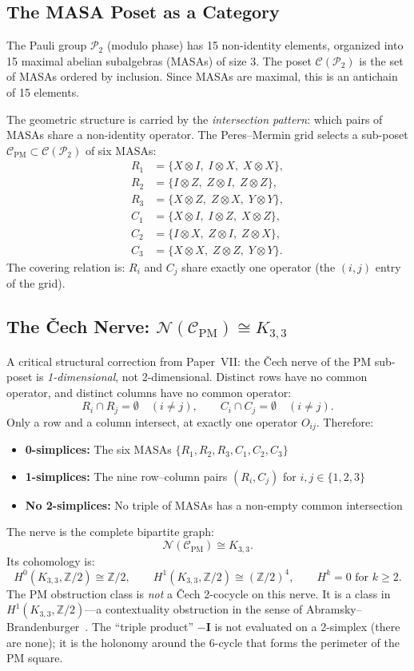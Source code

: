 \documentclass[11pt,a4paper]{article}
\theoremstyle{remark}
\newcommand{\Z}{\mathbb{Z}}
\newcommand{\cC}{\mathcal{C}}
\newcommand{\cN}{\mathcal{N}}
\newcommand{\PP}{\mathcal{P}}
\begin{document}
\subsection{The MASA Poset as a Category}

The Pauli group $\PP_2$ (modulo phase) has 15 non-identity elements,
organized into 15 maximal abelian subalgebras (MASAs) of size 3.
The poset $\cC(\PP_2)$ is the set of MASAs ordered by inclusion.
Since MASAs are maximal, this is an antichain of 15 elements.

The geometric structure is carried by the \emph{intersection pattern}:
which pairs of MASAs share a non-identity operator. The Peres--Mermin
grid selects a sub-poset $\cC_{\text{PM}} \subset \cC(\PP_2)$ of six MASAs:
\begin{align*}
  R_1 &= \{X \otimes I,\; I \otimes X,\; X \otimes X\}, \\
  R_2 &= \{I \otimes Z,\; Z \otimes I,\; Z \otimes Z\}, \\
  R_3 &= \{X \otimes Z,\; Z \otimes X,\; Y \otimes Y\}, \\
  C_1 &= \{X \otimes I,\; I \otimes Z,\; X \otimes Z\}, \\
  C_2 &= \{I \otimes X,\; Z \otimes I,\; Z \otimes X\}, \\
  C_3 &= \{X \otimes X,\; Z \otimes Z,\; Y \otimes Y\}.
\end{align*}
The covering relation is: $R_i$ and $C_j$ share exactly one operator
(the $(i,j)$ entry of the grid).

\subsection{The \v{C}ech Nerve: $\cN(\cC_{\text{PM}}) \cong K_{3,3}$}
\label{sec:k33}

A critical structural correction from Paper~VII: the \v{C}ech nerve of
the PM sub-poset is \emph{1-dimensional}, not 2-dimensional. Distinct
rows have no common operator, and distinct columns have no common operator:
\[
R_i \cap R_j = \emptyset \quad (i \neq j), \qquad
C_i \cap C_j = \emptyset \quad (i \neq j).
\]
Only a row and a column intersect, at exactly one operator $O_{ij}$.
Therefore:
\begin{itemize}
  \item \textbf{0-simplices:} The six MASAs $\{R_1, R_2, R_3, C_1, C_2, C_3\}$
  \item \textbf{1-simplices:} The nine row--column pairs $(R_i, C_j)$ for $i,j \in \{1,2,3\}$
  \item \textbf{No 2-simplices:} No triple of MASAs has a non-empty common intersection
\end{itemize}
The nerve is the complete bipartite graph:
\[
\cN(\cC_{\text{PM}}) \cong K_{3,3}.
\]
Its cohomology is:
\[
H^0(K_{3,3}, \Z/2) \cong \Z/2, \qquad
H^1(K_{3,3}, \Z/2) \cong (\Z/2)^4, \qquad
H^k = 0 \text{ for } k \geq 2.
\]
The PM obstruction class is \emph{not} a \v{C}ech 2-cocycle on this nerve.
It is a class in $H^1(K_{3,3}, \Z/2)$---a contextuality obstruction in the
sense of Abramsky--Brandenburger~\cite{AbramskyBrandenburger2011}. The
``triple product'' $-\mathbf{I}$ is not evaluated on a 2-simplex (there are
none); it is the holonomy around the 6-cycle that forms the perimeter of
the PM square.
\end{document}
